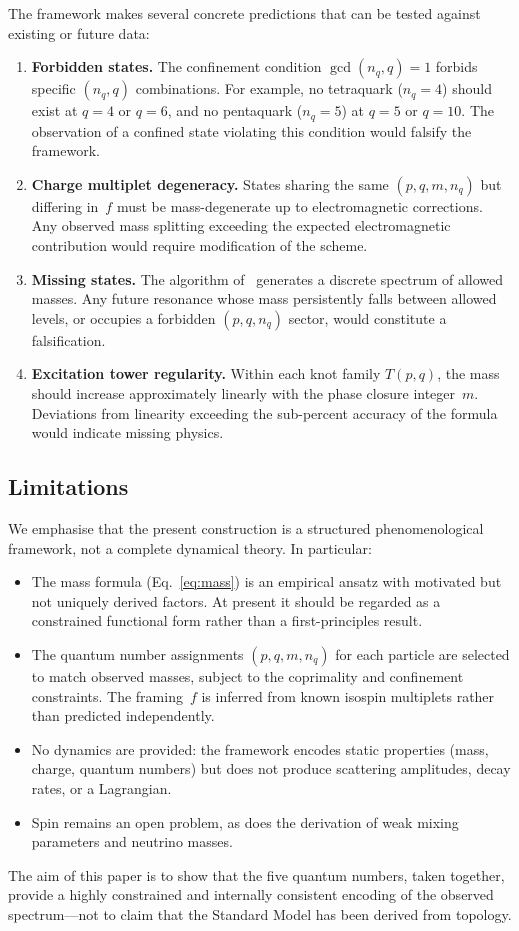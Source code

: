 \documentclass[11pt,a4paper]{article}
\begin{document}
The framework makes several concrete predictions that can
be tested against existing or future data:
\begin{enumerate}
\item \textbf{Forbidden states.}  The confinement condition
  $\gcd(n_q, q) = 1$ forbids specific $(n_q, q)$ combinations.
  For example, no tetraquark ($n_q = 4$) should exist at
  $q = 4$ or $q = 6$, and no pentaquark ($n_q = 5$) at $q = 5$
  or $q = 10$.  The observation of a confined state violating
  this condition would falsify the framework.
\item \textbf{Charge multiplet degeneracy.}  States sharing the
  same $(p, q, m, n_q)$ but differing in~$f$ must be
  mass-degenerate up to electromagnetic corrections.  Any
  observed mass splitting exceeding the expected electromagnetic
  contribution would require modification of the scheme.
\item \textbf{Missing states.}  The algorithm of~\cite{paper6}
  generates a discrete spectrum of allowed masses.  Any future
  resonance whose mass persistently falls between allowed levels,
  or occupies a forbidden $(p, q, n_q)$ sector, would constitute
  a falsification.
\item \textbf{Excitation tower regularity.}  Within each
  knot family $T(p,q)$, the mass should increase approximately
  linearly with the phase closure integer~$m$.  Deviations from
  linearity exceeding the sub-percent accuracy of the formula
  would indicate missing physics.
\end{enumerate}

\subsection{Limitations}

We emphasise that the present construction is a structured
phenomenological framework, not a complete dynamical theory.
In particular:
\begin{itemize}
\item The mass formula (Eq.~\ref{eq:mass}) is an empirical
  ansatz with motivated but not uniquely derived factors.
  At present it should be regarded as a constrained
  functional form rather than a first-principles result.
\item The quantum number assignments $(p, q, m, n_q)$ for
  each particle are selected to match observed masses,
  subject to the coprimality and confinement constraints.
  The framing~$f$ is inferred from known isospin multiplets
  rather than predicted independently.
\item No dynamics are provided: the framework encodes
  static properties (mass, charge, quantum numbers) but
  does not produce scattering amplitudes, decay rates, or
  a Lagrangian.
\item Spin remains an open problem, as does the derivation
  of weak mixing parameters and neutrino masses.
\end{itemize}
The aim of this paper is to show that the five quantum numbers,
taken together, provide a highly constrained and internally
consistent encoding of the observed spectrum---not to claim
that the Standard Model has been derived from topology.
\end{document}
